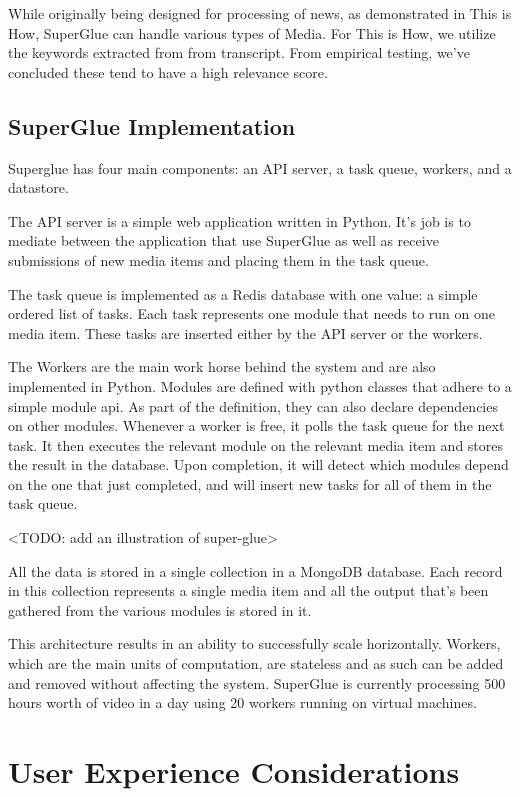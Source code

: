 While originally being designed for processing of news, as demonstrated in This is How, SuperGlue can handle various types of Media. For This is How, we utilize the keywords extracted from from transcript. From empirical testing, we've concluded these tend to have a high relevance score.    

\subsection{SuperGlue Implementation}

Superglue has four main components: an API server, a task queue, workers, and a datastore. 

The API server is a simple web application written in Python. It's job is to mediate between the application that use SuperGlue as well as receive submissions of new media items and placing them in the task queue. 

The task queue is implemented as a Redis database with one value: a simple ordered list of tasks. Each task represents one module that needs to run on one media item. These tasks are inserted either by the API server or the workers. 

The Workers are the main work horse behind the system and are also implemented in Python. Modules are defined with python classes that adhere to a simple module api. As part of the definition, they can also declare dependencies on other modules. Whenever a worker is free, it polls the task queue for the next task. It then executes the relevant module on the relevant media item and stores the result in the database. Upon completion, it will detect which modules depend on the one that just completed, and will insert new tasks for all of them in the task queue. 

<TODO: add an illustration of super-glue>

All the data is stored in a single collection in a MongoDB database. Each record in this collection represents a single media item and all the output that's been gathered from the various modules is stored in it. 

This architecture results in an ability to successfully scale horizontally. Workers, which are the main units of computation, are stateless and as such can be added and removed without affecting the system. SuperGlue is currently processing 500 hours worth of video in a day using 20 workers running on virtual machines.

\section{User Experience Considerations} 

